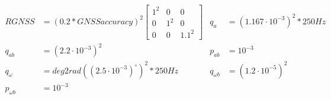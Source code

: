 \begin{align}
        RGNSS &= (0.2 * GNSSaccuracy)^2\begin{bmatrix}
    1^2 & 0 & 0 \\
    0 & 1^2 & 0 \\
    0 & 0 & 1.1^2
\end{bmatrix} & q_a &= (1.167 \cdot 10^{-3})^2 * 250Hz \label{eq:eskf-sim-tuning1} \\
        q_{ab} &= (2.2 \cdot 10^{-3})^2 & p_{ab} &= 10^{-3} \label{eq:eskf-sim-tuning2} \\
        q_\omega &= deg2rad((2.5 \cdot 10^{-3})^\circ)^2 * 250Hz  & q_{\omega b} &= (1.2 \cdot 10^{-5})^2 \label{eq:eskf-sim-tuning3} \\
        p_{\omega b} &= 10^{-3} \label{eq:eskf-sim-tuning4}
\end{align}

